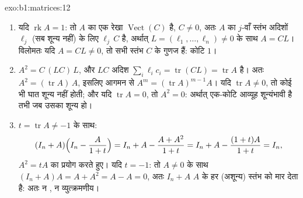 \begin{solution}{exo:b1:matrices:12}
\begin{enumerate}
  \item यदि $\operatorname{rk} A = 1$: तो $A$ का  एक रेखा
  $\operatorname{Vect}(C)$ है, $C \neq 0$, अतः $A$ का $j$-वाँ स्तंभ अदिशों
  $\ell_j$ (सब शून्य नहीं) के लिए $\ell_j\,C$ है, अर्थात् $L = (\ell_1,
  \dots, \ell_n) \neq 0$ के साथ $A = C L$। विलोमतः यदि $A = CL \neq 0$, तो
  सभी स्तंभ $C$ के गुणज हैं: कोटि $1$।
  \item $A^2 = C\,(L C)\,L$, और $LC$ अदिश $\sum_i \ell_i c_i =
  \operatorname{tr}(CL) = \operatorname{tr} A$ है। अतः $A^2 =
  (\operatorname{tr} A)\,A$, इसलिए आगमन से $A^m = (\operatorname{tr}
  A)^{m-1} A$। यदि $\operatorname{tr} A \neq 0$, तो कोई भी घात शून्य नहीं
  होती; और यदि $\operatorname{tr} A = 0$, तो $A^2 = 0$: अर्थात् एक-कोटि
  आव्यूह शून्यंभावी है तभी जब उसका  शून्य हो।
  \item $t = \operatorname{tr} A \neq -1$ के साथ:
        \[
        (I_n + A)\Bigl(I_n - \frac{A}{1 + t}\Bigr)
        = I_n + A - \frac{A + A^2}{1 + t}
        = I_n + A - \frac{(1 + t)A}{1 + t} = I_n ,
        \]
        $A^2 = tA$ का प्रयोग करते हुए। यदि $t = -1$: तो $A \neq 0$ के साथ
        $(I_n + A)A = A + A^2 = A - A = 0$, अतः $I_n + A$ $A$ के हर (अशून्य)
        स्तंभ को मार देता है: अतः न , न व्युत्क्रमणीय।
\end{enumerate}
\end{solution}

